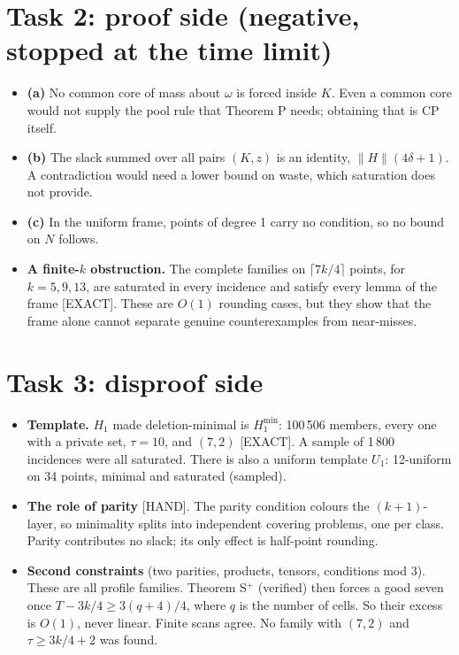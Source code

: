 \documentclass[11pt]{article}
\newcommand{\lvl}[1]{\textsf{\small[#1]}}
\begin{document}
\section*{Task 2: proof side (negative, stopped at the time limit)}
\begin{itemize}
\item \textbf{(a)} No common core of mass about $\omega$ is forced inside $K$. Even a common core would not supply the
pool rule that Theorem P needs; obtaining that is CP itself.
\item \textbf{(b)} The slack summed over all pairs $(K,z)$ is an identity, $\|H\|(4\delta+1)$. A contradiction would
need a lower bound on waste, which saturation does not provide.
\item \textbf{(c)} In the uniform frame, points of degree 1 carry no condition, so no bound on $N$ follows.
\item \textbf{A finite-$k$ obstruction.} The complete families on $\lceil 7k/4\rceil$ points, for $k=5,9,13$, are
saturated in every incidence and satisfy every lemma of the frame \lvl{EXACT}. These are $O(1)$ rounding cases, but
they show that the frame alone cannot separate genuine counterexamples from near-misses.
\end{itemize}

\section*{Task 3: disproof side}
\begin{itemize}
\item \textbf{Template.} $H_1$ made deletion-minimal is $H_1^{\min}$: 100\,506 members, every one with a private set,
$\tau=10$, and $(7,2)$ \lvl{EXACT}. A sample of 1\,800 incidences were all saturated. There is also a uniform template
$U_1$: 12-uniform on 34 points, minimal and saturated (sampled).
\item \textbf{The role of parity} \lvl{HAND}. The parity condition colours the $(k+1)$-layer, so minimality splits into
independent covering problems, one per class. Parity contributes no slack; its only effect is half-point rounding.
\item \textbf{Second constraints} (two parities, products, tensors, conditions mod 3). These are all profile families.
Theorem S$^+$ (verified) then forces a good seven once $T-3k/4\ge 3(q+4)/4$, where $q$ is the number of cells. So their
excess is $O(1)$, never linear. Finite scans agree. No family with $(7,2)$ and $\tau\ge 3k/4+2$ was found.
\end{itemize}
\end{document}
